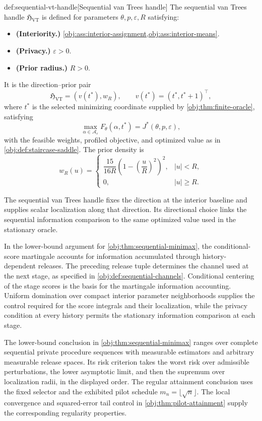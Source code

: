 \begin{definitionv}{def:sequential-vt-handle}[Sequential van Trees handle]
The sequential van Trees handle \(\mathfrak H_{\mathrm{VT}}\) is defined for parameters \(\theta,p,\varepsilon,R\) satisfying:
\begin{itemize}
\item \textbf{(Interiority.)} \cref{obj:ass:interior-assignment,obj:ass:interior-means}.
\item \textbf{(Privacy.)} \(\varepsilon>0\).
\item \textbf{(Prior radius.)} \(R>0\).
\end{itemize}
It is the direction--prior pair
\[
\mathfrak H_{\mathrm{VT}}=(v(t^*),w_R),
\qquad
v(t^*)=(t^*,t^*+1)^{\top},
\]
where \(t^*\) is the selected minimizing coordinate supplied by \cref{obj:thm:finite-oracle}, satisfying
\[
\max_{\alpha\in\mathcal A_\varepsilon}F_\theta(\alpha,t^*)
=J^*(\theta,p,\varepsilon),
\]
with the feasible weights, profiled objective, and optimized value as in \cref{obj:def:staircase-saddle}. The prior density is
\[
w_R(u)=
\begin{cases}
\dfrac{15}{16R}\left(1-\left(\dfrac{u}{R}\right)^2\right)^2,
& |u|<R,\\
0,& |u|\ge R.
\end{cases}
\]
\end{definitionv}

The sequential van Trees handle  fixes the direction at the interior baseline and supplies scalar localization along that direction. Its directional choice links the sequential information comparison to the same optimized value used in the stationary oracle.

In the lower-bound argument for \cref{obj:thm:sequential-minimax}, the conditional-score martingale accounts for information accumulated through history-dependent releases. The preceding release tuple  determines the channel used at the next stage, as specified in \cref{obj:def:sequential-channels}. Conditional centering of the stage scores is the basis for the martingale information accounting. Uniform domination over compact interior parameter neighborhoods supplies the control required for the score integrals and their localization, while the privacy condition at every history permits the stationary information comparison at each stage.

The lower-bound conclusion in \cref{obj:thm:sequential-minimax} ranges over complete sequential private procedure sequences with measurable estimators and arbitrary measurable release spaces. Its risk criterion takes the worst risk over admissible perturbations, the lower asymptotic limit, and then the supremum over localization radii, in the displayed order. The regular attainment conclusion uses the fixed selector and the exhibited pilot schedule \(m_n=\lfloor\sqrt n\rfloor\). The local convergence and squared-error tail control in \cref{obj:thm:pilot-attainment} supply the corresponding regularity properties.

